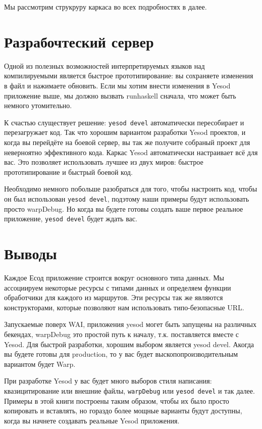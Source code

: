 Мы рассмотрим струкруру каркаса во всех подробностях в далее.

\section{Разрабочтеский сервер}

Одной из полезных возможностей интерпретируемых языков над компилируемыми является быстрое прототипирование: 
вы сохраняете изменения в файл и нажимаете обновить. Если мы хотим внести изменения в Yesod
приложение выше, мы должно вызвать runhaskell сначала, что может быть немного утомительно.

К счастью слуществует решение: \lstinline'yesod devel' автоматически пересобирает и перезагружает
код. Так что хорошим вариантом разработки Yesod проектов, и когда вы перейдёте на боевой сервер,
вы так же получите собраный проект для неверноятно эффективного кода. Каркас Yesod автоматически
настраивает всё для вас. Это позволяет использовать лучшее из двух миров: быстрое прототипирование 
и быстрый боевой код.

Необходимо немного побольше разобраться для того, чтобы настроить код, чтобы он был использован
\lstinline'yesod devel', подэтому наши примеры будут использовать просто warpDebug. Но когда вы будете готовы
создать ваше первое реальное приложение, \lstinline'yesod devel' будет ждать вас.

\section{Выводы}

Каждое Есод приложение строится вокруг основного типа данных. Мы ассоциируем некоторые ресурсы
с типами данных и определяем функции обработчики для каждого из маршрутов. Эти ресурсы так же
являются конструкторами, которые позволяют нам использовать типо-безопасные URL.

Запускаемые поверх WAI, приложения yesod могет быть запущены на различных бекендах, warpDebug
это простой путь к началу, т.к. поставляется вместе с Yesod. Для быстрой разработки, хорошим
выбором является yesod devel. Акогда вы будете готовы для production, то у вас будет выскопопроизводительным
вариантом будет Warp.

При разработке Yesod у вас будет много выборов стиля написания: квазицитирование или внешние файлы,
\lstinline{warpDebug} или \lstinline'yesod devel' и так далее. Примеры в этой книги построены 
таким образом, чтобы их было просто копировать и вставлять, но гораздо более мощные варианты 
будут доступны, когда вы начнете создавать реальные Yesod приложения.
